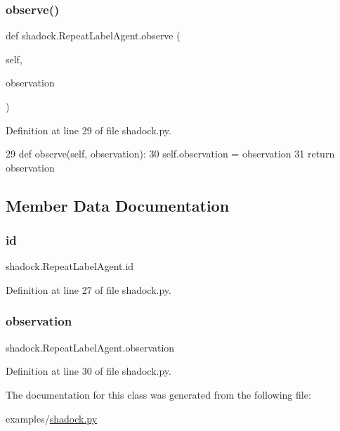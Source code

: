 \subsubsection{\texorpdfstring{observe()}{observe()}}
{\footnotesize\ttfamily def shadock.\+Repeat\+Label\+Agent.\+observe (\begin{DoxyParamCaption}\item[{}]{self,  }\item[{}]{observation }\end{DoxyParamCaption})}



Definition at line 29 of file shadock.\+py.


\begin{DoxyCode}
29     \textcolor{keyword}{def }observe(self, observation):
30         self.observation = observation
31         \textcolor{keywordflow}{return} observation
\end{DoxyCode}


\subsection{Member Data Documentation}
\mbox{\label{classshadock_1_1RepeatLabelAgent_af4a393b8da6a36d52f38ea8162efae09}} 
\subsubsection{\texorpdfstring{id}{id}}
{\footnotesize\ttfamily shadock.\+Repeat\+Label\+Agent.\+id}



Definition at line 27 of file shadock.\+py.

\mbox{\label{classshadock_1_1RepeatLabelAgent_a2455b332a14c998490f888f28322a3bd}} 
\subsubsection{\texorpdfstring{observation}{observation}}
{\footnotesize\ttfamily shadock.\+Repeat\+Label\+Agent.\+observation}



Definition at line 30 of file shadock.\+py.



The documentation for this class was generated from the following file\+:\begin{DoxyCompactItemize}
\item 
examples/\hyperlink{shadock_8py}{shadock.\+py}\end{DoxyCompactItemize}
